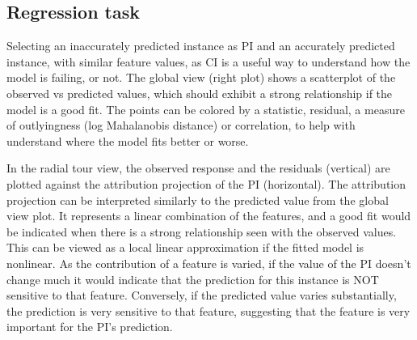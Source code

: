 \documentclass[
]{article}
\begin{document}
\hypertarget{regression-task}{%
\subsection{Regression task}\label{regression-task}}

Selecting an inaccurately predicted instance as PI and an accurately predicted instance, with similar feature values, as CI is a useful way to understand how the model is failing, or not. The global view (right plot) shows a scatterplot of the observed vs predicted values, which should exhibit a strong relationship if the model is a good fit. The points can be colored by a statistic, residual, a measure of outlyingness (log Mahalanobis distance) or correlation, to help with understand where the model fits better or worse.

In the radial tour view, the observed response and the residuals (vertical) are plotted against the attribution projection of the PI (horizontal). The attribution projection can be interpreted similarly to the predicted value from the global view plot. It represents a linear combination of the features, and a good fit would be indicated when there is a strong relationship seen with the observed values. This can be viewed as a local linear approximation if the fitted model is nonlinear. As the contribution of a feature is varied, if the value of the PI doesn't change much it would indicate that the prediction for this instance is NOT sensitive to that feature. Conversely, if the predicted value varies substantially, the prediction is very sensitive to that feature, suggesting that the feature is very important for the PI's prediction.
\end{document}
